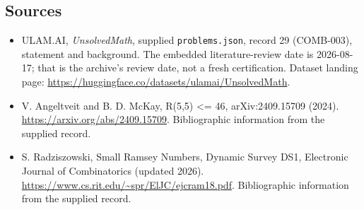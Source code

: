 \documentclass[11pt,a4paper]{article}
\begin{document}
\subsection{Sources}

{\small

\begin{itemize}

\item[\hypertarget{source:29:1}{S1}] ULAM.AI, \emph{UnsolvedMath}, supplied \texttt{problems.json}, record 29 (COMB-003), statement and background. The embedded literature-review date is 2026-08-17; that is the archive’s review date, not a fresh certification. Dataset landing page: \url{https://huggingface.co/datasets/ulamai/UnsolvedMath}.

\item[\hypertarget{source:29:2}{S2}] V. Angeltveit and B. D. McKay, R(5,5) <= 46, arXiv:2409.15709 (2024). \url{https://arxiv.org/abs/2409.15709}. Bibliographic information from the supplied record.

\item[\hypertarget{source:29:3}{S3}] S. Radziszowski, Small Ramsey Numbers, Dynamic Survey DS1, Electronic Journal of Combinatorics (updated 2026). \url{https://www.cs.rit.edu/~spr/ElJC/ejcram18.pdf}. Bibliographic information from the supplied record.

\end{itemize}

}

\label{end:29}
\end{document}
